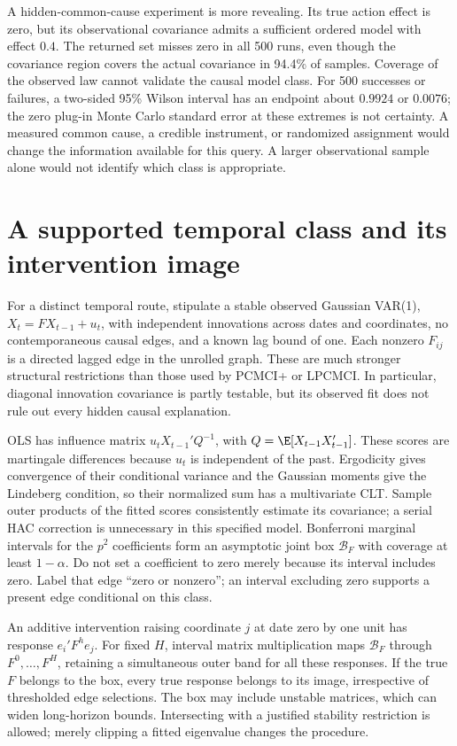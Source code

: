 A hidden-common-cause experiment is more revealing. Its true action
effect is zero, but its observational covariance admits a sufficient
ordered model with effect $0.4$. The returned set misses zero in all
500 runs, even though the covariance region covers the actual covariance
in 94.4\% of samples. Coverage of the observed law cannot validate the
causal model class. For 500 successes or failures, a two-sided 95\%
Wilson interval has an endpoint about $0.9924$ or $0.0076$; the zero
plug-in Monte Carlo standard error at these extremes is not certainty.
A measured common cause, a credible instrument, or randomized assignment
would change the information available for this query. A larger
observational sample alone would not identify which class is appropriate.

\section{A supported temporal class and its intervention image}
\label{s4:temporal-graph-confidence}
For a distinct temporal route, stipulate a stable observed Gaussian
VAR(1), $X_t=FX_{t-1}+u_t$, with independent innovations across dates
and coordinates, no contemporaneous causal edges, and a known lag bound
of one. Each nonzero $F_{ij}$ is a directed lagged edge in the unrolled
graph. These are much stronger structural restrictions than those used
by PCMCI+ or LPCMCI. In particular, diagonal innovation covariance is
partly testable, but its observed fit does not rule out every hidden
causal explanation.

OLS has influence matrix $u_tX_{t-1}'Q^{-1}$, with
$Q=\E[X_{t-1}X_{t-1}']$. These scores are martingale differences
because $u_t$ is independent of the past. Ergodicity gives convergence
of their conditional variance and the Gaussian moments give the
Lindeberg condition, so their normalized sum has a multivariate CLT.
Sample outer products of the fitted scores consistently estimate its
covariance; a serial HAC correction is unnecessary in this specified
model. Bonferroni marginal intervals for the $p^2$ coefficients form
an asymptotic joint box $\mathcal B_F$ with coverage at least $1-\alpha$.
Do not set a coefficient to zero merely because its interval includes zero.
Label that edge ``zero or nonzero''; an interval excluding zero supports
a present edge conditional on this class.

An additive intervention raising coordinate $j$ at date zero by one unit
has response $e_i'F^he_j$. For fixed $H$, interval matrix multiplication
maps $\mathcal B_F$ through $F^0,\ldots,F^H$, retaining a simultaneous
outer band for all these responses. If the true $F$ belongs to the box,
every true response belongs to its image, irrespective of thresholded
edge selections. The box may include unstable matrices, which can widen
long-horizon bounds. Intersecting with a justified stability restriction
is allowed; merely clipping a fitted eigenvalue changes the procedure.

